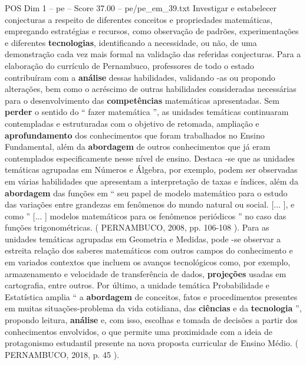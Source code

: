 \begin{textsample}{POS Dim 1 – pe – Score 37.00 – pe/pe\_em\_39.txt}
Investigar e estabelecer conjecturas a respeito de diferentes conceitos e propriedades matemáticas, empregando estratégias e recursos, como observação de padrões, experimentações e diferentes \textbf{tecnologias}, identificando a necessidade, ou não, de uma demonstração cada vez mais formal na validação das referidas conjecturas.
Para a elaboração do currículo de Pernambuco, professores de todo o estado contribuíram com a \textbf{análise} dessas habilidades, validando -as ou propondo alterações, bem como o acréscimo de outras habilidades consideradas necessárias para o desenvolvimento das \textbf{competências} matemáticas apresentadas.
Sem \textbf{perder} o sentido do “ fazer matemática ”, as unidades temáticas continuaram contempladas e estruturadas com o objetivo de retomada, ampliação e \textbf{aprofundamento} dos conhecimentos que foram trabalhados no Ensino Fundamental, além da \textbf{abordagem} de outros conhecimentos que já eram contemplados especificamente nesse nível de ensino.
Destaca -se que as unidades temáticas agrupadas em Números e Álgebra, por exemplo, podem ser observadas em várias habilidades que apresentam a interpretação de taxas e índices, além da \textbf{abordagem} das funções em “ seu papel de modelo matemático para o estudo das variações entre grandezas em fenômenos do mundo natural ou social. [... ], e como ” [... ] modelos matemáticos para os fenômenos periódicos ” no caso das funções trigonométricas. ( PERNAMBUCO, 2008, pp. 106-108 ).
Para as unidades temáticas agrupadas em Geometria e Medidas, pode -se observar a estreita relação dos saberes matemáticos com outros campos do conhecimento e em variados contextos que incluem os avanços tecnológicos como, por exemplo, armazenamento e velocidade de transferência de dados, \textbf{projeções} usadas em cartografia, entre outros.
Por último, a unidade temática Probabilidade e Estatística amplia “ a \textbf{abordagem} de conceitos, fatos e procedimentos presentes em muitas situações-problema da vida cotidiana, das \textbf{ciências} e da \textbf{tecnologia} ”, propondo leitura, \textbf{análise} e, com isso, escolhas e tomada de decisões a partir dos conhecimentos envolvidos, o que permite uma proximidade com a ideia de protagonismo estudantil presente na nova proposta curricular de Ensino Médio. ( PERNAMBUCO, 2018, p. 45 ).

\end{textsample}
